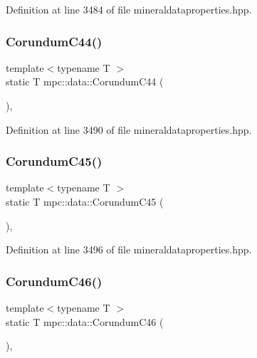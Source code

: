 Definition at line 3484 of file mineraldataproperties.\+hpp.

\mbox{\label{namespacempc_1_1data_aabdcb48654339bafdde09939d6ace19d}} 
\subsubsection{\texorpdfstring{Corundum\+C44()}{CorundumC44()}}
{\footnotesize\ttfamily template$<$typename T $>$ \\
static T mpc\+::data\+::\+Corundum\+C44 (\begin{DoxyParamCaption}{ }\end{DoxyParamCaption})\hspace{0.3cm}{\ttfamily [inline]}, {\ttfamily [static]}}



Definition at line 3490 of file mineraldataproperties.\+hpp.

\mbox{\label{namespacempc_1_1data_af222e2065c81110150101038ea5e64fa}} 
\subsubsection{\texorpdfstring{Corundum\+C45()}{CorundumC45()}}
{\footnotesize\ttfamily template$<$typename T $>$ \\
static T mpc\+::data\+::\+Corundum\+C45 (\begin{DoxyParamCaption}{ }\end{DoxyParamCaption})\hspace{0.3cm}{\ttfamily [inline]}, {\ttfamily [static]}}



Definition at line 3496 of file mineraldataproperties.\+hpp.

\mbox{\label{namespacempc_1_1data_ab260906575e5653e282a97bcf4b93c3f}} 
\subsubsection{\texorpdfstring{Corundum\+C46()}{CorundumC46()}}
{\footnotesize\ttfamily template$<$typename T $>$ \\
static T mpc\+::data\+::\+Corundum\+C46 (\begin{DoxyParamCaption}{ }\end{DoxyParamCaption})\hspace{0.3cm}{\ttfamily [inline]}, {\ttfamily [static]}}



